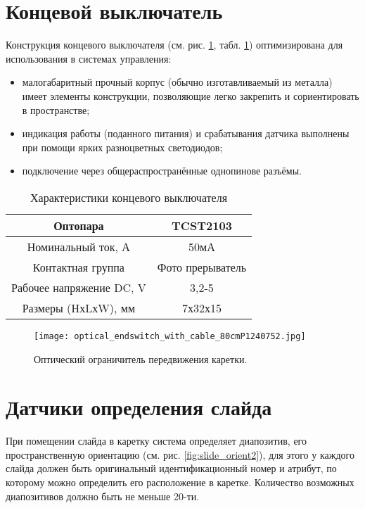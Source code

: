 \section{Концевой выключатель}
Конструкция концевого выключателя (см. рис. \ref{fig:optical_end}, табл. \ref{tab:optical_end}) оптимизирована для использования в системах управления:
\begin{itemize}
\item малогабаритный прочный корпус (обычно изготавливаемый из металла) имеет элементы конструкции, позволяющие легко закрепить и сориентировать в пространстве;
\item индикация работы (поданного питания) и срабатывания датчика выполнены при помощи ярких разноцветных светодиодов;
\item подключение через общераспространённые однопинове разъёмы.
\end{itemize}
\begin{table}[ht]
	\centering
	\begin{tabular}{|c|c|}
	\hline 
	Оптопара & TCST2103 \\ 
	\hline 
	Номинальный ток, А & 50мА \\ 
	\hline 
	Контактная группа & Фото прерыватель \\ 
	\hline 
	Рабочее напряжение DC, V & 3,2-5 \\ 
	\hline 
	Размеры (HхLхW), мм & 7х32х15 \\ 
	\hline 
	\end{tabular} 
	\caption{Характеристики концевого выключателя}
	\label{tab:optical_end}
\end{table}

\begin{figure}[ht]
	\centering
     \texttt{[image: optical\_endswitch\_with\_cable\_80cmP1240752.jpg]}
	\caption{Оптический ограничитель передвижения каретки.}
	\label{fig:optical_end}
\end{figure}

\section{Датчики определения слайда}
При помещении слайда в каретку система определяет диапозитив, его пространственную ориентацию (см. рис. \ref{fig:slide_orient2}), для этого у каждого слайда должен быть оригинальный идентификационный номер и атрибут, по которому можно определить его расположение в каретке. Количество возможных диапозитивов должно быть не меньше 20-ти.

